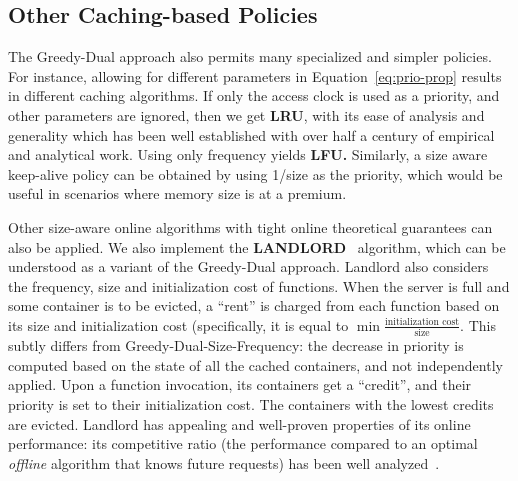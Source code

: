 \subsection{Other Caching-based Policies}
\label{subsec:variants}
\vspace*{\subsecspace}

The Greedy-Dual approach also permits many specialized and simpler policies.
For instance, allowing for different parameters in Equation~\ref{eq:prio-prop} results in different caching algorithms.
If only the access clock is used as a priority, and other parameters are ignored, then we get \textbf{LRU}, with its ease of analysis and generality which has been well established with over half a century of empirical and analytical work. 
Using only frequency yields \textbf{LFU.}
Similarly, a size aware keep-alive policy can be obtained by using 1/size as the priority, which would be useful in scenarios where memory size is at a premium. 


Other size-aware online algorithms with tight online theoretical guarantees can also be applied.
We also implement the \textbf{LANDLORD}~\cite{young2002line} algorithm, which can be understood as a variant of the Greedy-Dual approach.
Landlord also considers the frequency, size and initialization cost of functions.
When the server is full and some container is to be evicted, a ``rent'' is charged from each function based on its size and initialization cost (specifically, it is equal to $\min \frac{\text{initialization cost}}{\text{size}}$.
This subtly differs from Greedy-Dual-Size-Frequency: the decrease in priority is computed based on the state of all the cached containers, and not independently applied. 
Upon a function invocation, its containers get a ``credit'', and their priority is set to their initialization cost. 
The containers with the lowest credits are evicted. 
Landlord has appealing and well-proven properties of its online performance: its competitive ratio (the performance compared to an optimal \emph{offline} algorithm that knows future requests) has been well analyzed~\cite{young2002line}. 




